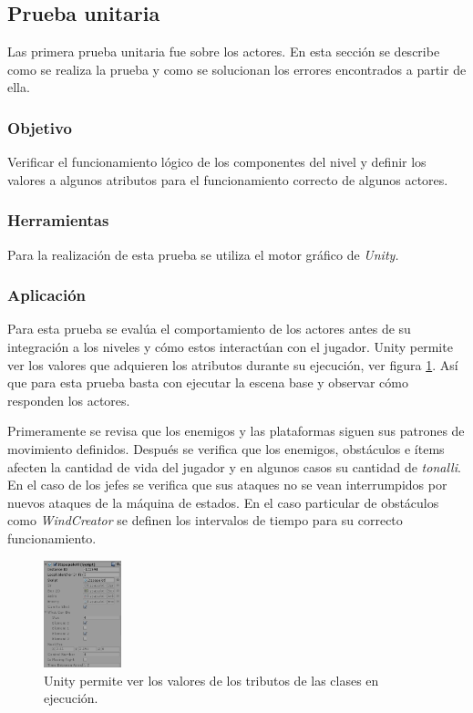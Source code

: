 \subsection{Prueba unitaria}
Las primera prueba unitaria fue sobre los actores. En esta sección se describe
como se realiza la prueba y como se solucionan los errores encontrados a partir
de ella.

\subsubsection{Objetivo}
Verificar el funcionamiento lógico de los componentes del nivel y definir los
valores a algunos atributos para el funcionamiento correcto de algunos actores.

\subsubsection{Herramientas}
Para la realización de esta prueba se utiliza el motor gráfico de 
\textit{Unity.}

\subsubsection{Aplicación}
Para esta prueba se evalúa el comportamiento de los actores antes de su
integración a los niveles y cómo estos interactúan con el jugador. Unity permite
ver los valores que adquieren los atributos durante su ejecución, ver figura
\ref{fig:Debug01}. Así que para esta prueba basta con ejecutar la escena
base y observar cómo responden los actores.
\\
\par
Primeramente se revisa que los enemigos y las plataformas siguen sus patrones de
movimiento definidos. Después se verifica que los enemigos, obstáculos e ítems
afecten la cantidad de vida del jugador y en algunos casos su cantidad de
\textit{tonalli}. En el caso de los jefes se verifica que sus ataques no se vean
interrumpidos por nuevos ataques de la máquina de estados. En el caso particular
de obstáculos como \textit{WindCreator} se definen los intervalos de tiempo
para su correcto funcionamiento.

        \begin{figure}[h]
                \centering
                \includegraphics[width=0.2\textwidth]{04ResultadosObetnidos/imagenes/enemyPruebas01.png}
                \caption{Unity permite ver los valores de los tributos de las clases en ejecución.}
                \label{fig:Debug01}
        \end{figure}
        
